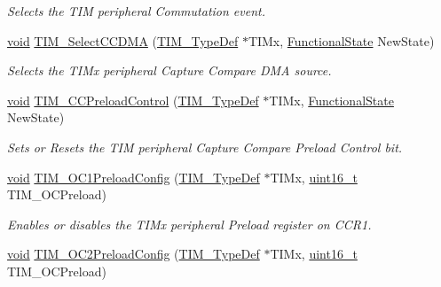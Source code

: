 \begin{DoxyCompactItemize}
\begin{DoxyCompactList}\small\item\em Selects the T\+IM peripheral Commutation event. \end{DoxyCompactList}\item 
\hyperlink{usb__devapi_8h_afabf60e7f57651d6d595a02c75f07cd0}{void} \hyperlink{group___t_i_m___private___functions_ga5273cb65acb885fe7982827b1c6b7d75}{T\+I\+M\+\_\+\+Select\+C\+C\+D\+MA} (\hyperlink{struct_t_i_m___type_def}{T\+I\+M\+\_\+\+Type\+Def} $\ast$T\+I\+Mx, \hyperlink{agilefox_2library_2inc_2stm32f10x__type_8h_ac9a7e9a35d2513ec15c3b537aaa4fba1}{Functional\+State} New\+State)
\begin{DoxyCompactList}\small\item\em Selects the T\+I\+Mx peripheral Capture Compare D\+MA source. \end{DoxyCompactList}\item 
\hyperlink{usb__devapi_8h_afabf60e7f57651d6d595a02c75f07cd0}{void} \hyperlink{group___t_i_m___private___functions_ga0a935254e44312b1d78e8684a58db3c1}{T\+I\+M\+\_\+\+C\+C\+Preload\+Control} (\hyperlink{struct_t_i_m___type_def}{T\+I\+M\+\_\+\+Type\+Def} $\ast$T\+I\+Mx, \hyperlink{agilefox_2library_2inc_2stm32f10x__type_8h_ac9a7e9a35d2513ec15c3b537aaa4fba1}{Functional\+State} New\+State)
\begin{DoxyCompactList}\small\item\em Sets or Resets the T\+IM peripheral Capture Compare Preload Control bit. \end{DoxyCompactList}\item 
\hyperlink{usb__devapi_8h_afabf60e7f57651d6d595a02c75f07cd0}{void} \hyperlink{group___t_i_m___private___functions_ga60e6c29ad8f919bef616cf8e3306dd64}{T\+I\+M\+\_\+\+O\+C1\+Preload\+Config} (\hyperlink{struct_t_i_m___type_def}{T\+I\+M\+\_\+\+Type\+Def} $\ast$T\+I\+Mx, \hyperlink{_p_e___types_8h_a1f1825b69244eb3ad2c7165ddc99c956}{uint16\+\_\+t} T\+I\+M\+\_\+\+O\+C\+Preload)
\begin{DoxyCompactList}\small\item\em Enables or disables the T\+I\+Mx peripheral Preload register on C\+C\+R1. \end{DoxyCompactList}\item 
\hyperlink{usb__devapi_8h_afabf60e7f57651d6d595a02c75f07cd0}{void} \hyperlink{group___t_i_m___private___functions_ga75b4614c6dd2cd52f2c5becdb6590c10}{T\+I\+M\+\_\+\+O\+C2\+Preload\+Config} (\hyperlink{struct_t_i_m___type_def}{T\+I\+M\+\_\+\+Type\+Def} $\ast$T\+I\+Mx, \hyperlink{_p_e___types_8h_a1f1825b69244eb3ad2c7165ddc99c956}{uint16\+\_\+t} T\+I\+M\+\_\+\+O\+C\+Preload)

\end{DoxyCompactItemize}
